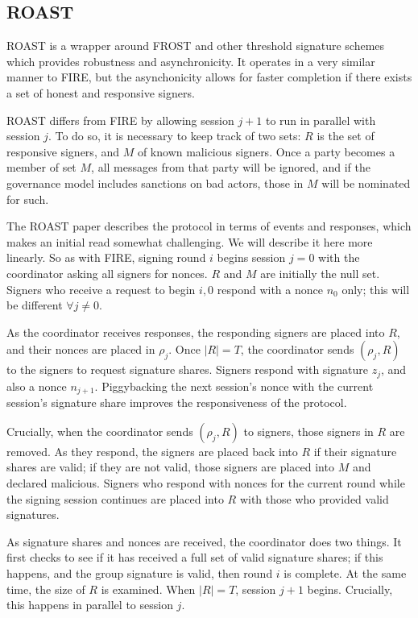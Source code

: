 \documentclass{article}
\begin{document}
\subsection{
  ROAST
}

ROAST\cite{roast} is a wrapper around FROST and other threshold signature schemes which provides robustness and asynchronicity.  It operates in a very similar manner to FIRE, but the asynchonicity allows for faster completion if there exists a set of honest and responsive signers.

ROAST differs from FIRE by allowing session $j+1$ to run in parallel with session $j$.  To do so, it is necessary to keep track of two sets: $R$ is the set of responsive signers, and $M$ of known malicious signers.  Once a party becomes a member of set $M$, all messages from that party will be ignored, and if the governance model includes sanctions on bad actors, those in $M$ will be nominated for such.

The ROAST paper describes the protocol in terms of events and responses, which makes an initial read somewhat challenging.  We will describe it here more linearly.  So as with FIRE, signing round $i$ begins session $j = 0$ with the coordinator asking all signers for nonces.  $R$ and $M$ are initially the null set.  Signers who receive a request to begin $i,0$ respond with a nonce $n_0$ only; this will be different $\forall j \neq 0$.

As the coordinator receives responses, the responding signers are placed into $R$, and their nonces are placed in $\rho_j$.  Once $|R| = T$, the coordinator sends $(\rho_j, R)$ to the signers to request signature shares.  Signers respond with signature $z_j$, and also a nonce $n_{j+1}$.  Piggybacking the next session's nonce with the current session's signature share improves the responsiveness of the protocol.

Crucially, when the coordinator sends $(\rho_j, R)$ to signers, those signers in $R$ are removed.  As they respond, the signers are placed back into $R$ if their signature shares are valid; if they are not valid, those signers are placed into $M$ and declared malicious.  Signers who respond with nonces for the current round while the signing session continues are placed into $R$ with those who provided valid signatures.

As signature shares and nonces are received, the coordinator does two things.  It first checks to see if it has received a full set of valid signature shares; if this happens, and the group signature is valid, then round $i$ is complete.  At the same time, the size of $R$ is examined.  When $|R| = T$, session $j+1$ begins.  Crucially, this happens in parallel to session $j$.
\end{document}

